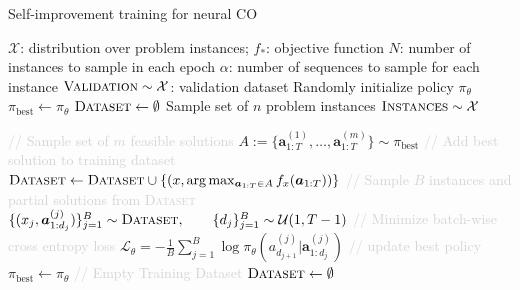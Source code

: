 \begin{algorithm}[h]
   \caption{Self-improvement training for neural CO}
   \label{algo:learning}
   \begin{algorithmic}[1]
      \REQUIRE $\mathcal{X}$: distribution over problem instances; $f_*$: objective function
      \REQUIRE $N$: number of instances to sample in each epoch
      \REQUIRE $\alpha$: number of sequences to sample for each instance
      \REQUIRE $\textsc{Validation} \sim \mathcal{X}$: validation dataset
      \STATE Randomly initialize policy $\pi_\theta$
      \STATE $\pi_{\text{best}} \gets \pi_\theta$
      \STATE $\textsc{Dataset} \gets \emptyset$
          \STATE Sample set of $n$ problem instances $\textsc{Instances} \sim \mathcal{X}$
              
              \STATE \textcolor{lightgray}{// Sample set of $m$ feasible solutions}
              \STATE $A := \{\bm a_{1:T}^{(1)}, \dots, \bm a_{1:T}^{(m)}\} \sim \pi_{\text{best}}$
              \STATE \textcolor{lightgray}{// Add best solution to training dataset}
              \STATE $\textsc{Dataset} \gets \textsc{Dataset} \cup \{(x, \arg\max_{\bm a_{1:T} \in A} f_x(\bm a_{1:T}))\}$ 
          \ENDFOR
              \STATE \textcolor{lightgray}{// Sample $B$ instances and partial solutions from \textsc{Dataset}}
              \STATE $\{(x_j, \bm{a}^{(j)}_{1:d_j})\}_{j=1}^B \sim \textsc{Dataset}, \qquad \{d_j\}_{j=1}^B \sim \mathcal{U}(1, T-1)$ 
              \STATE \textcolor{lightgray}{// Minimize batch-wise cross entropy loss}
              \STATE $\mathcal{L}_\theta = - \frac{1}{B}\sum_{j=1}^B \log \pi_\theta \left( a^{(j)}_{d_{j+1}} | \bm a^{(j)}_{1:d_j} \right)$
          \ENDFOR
              \STATE \textcolor{lightgray}{// update best policy}
              \STATE $\pi_{\text{best}} \gets \pi_\theta$ 
              \STATE \textcolor{lightgray}{// Empty Training Dataset}
              \STATE $\textsc{Dataset} \gets \emptyset$ 
          \ENDIF
      \ENDFOR
   \end{algorithmic}
\end{algorithm}


